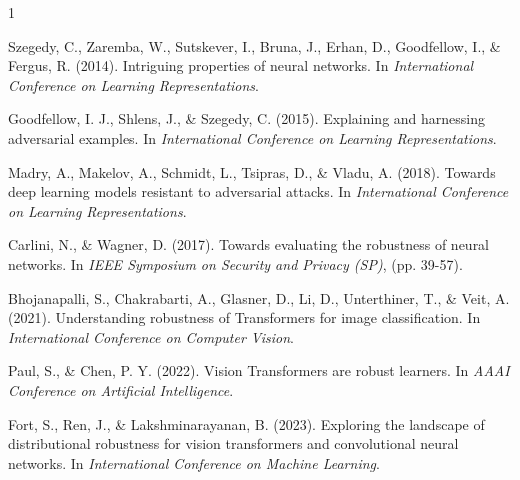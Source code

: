 \documentclass[a4paper,12pt]{article}
\begin{document}

\begin{thebibliography}{1}

Szegedy, C., Zaremba, W., Sutskever, I., Bruna, J., Erhan, D., Goodfellow, I., \& Fergus, R. (2014).
\newblock Intriguing properties of neural networks.
\newblock In \textit{International Conference on Learning Representations}.

Goodfellow, I. J., Shlens, J., \& Szegedy, C. (2015).
\newblock Explaining and harnessing adversarial examples.
\newblock In \textit{International Conference on Learning Representations}.

Madry, A., Makelov, A., Schmidt, L., Tsipras, D., \& Vladu, A. (2018).
\newblock Towards deep learning models resistant to adversarial attacks.
\newblock In \textit{International Conference on Learning Representations}.

Carlini, N., \& Wagner, D. (2017).
\newblock Towards evaluating the robustness of neural networks.
\newblock In \textit{IEEE Symposium on Security and Privacy (SP)}, (pp. 39-57).

Bhojanapalli, S., Chakrabarti, A., Glasner, D., Li, D., Unterthiner, T., \& Veit, A. (2021).
\newblock Understanding robustness of Transformers for image classification.
\newblock In \textit{International Conference on Computer Vision}.

Paul, S., \& Chen, P. Y. (2022).
\newblock Vision Transformers are robust learners.
\newblock In \textit{AAAI Conference on Artificial Intelligence}.

Fort, S., Ren, J., \& Lakshminarayanan, B. (2023).
\newblock Exploring the landscape of distributional robustness for vision transformers and convolutional neural networks.
\newblock In \textit{International Conference on Machine Learning}.

\end{thebibliography}
\end{document}
